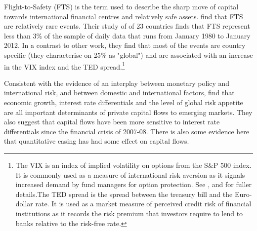 \documentclass[12pt, a4paper, oneside]{article} %
\begin{document}
Flight-to-Safety (FTS) is the term used to describe the sharp move of capital towards international financial centres and relatively safe assets.\citet{FTS} find that FTS are relatively rare events. Their study of of 23 countries finds that FTS represent less than 3\% of the sample of daily data that runs from January 1980 to January 2012.  In a contrast to other work, they find that most of the events are country specific (they characterise on 25\% as "global") and are associated with an increase in the VIX index and the TED spread.\footnote{The VIX is an index of implied volatility on options from the S\&P 500 index.  It is commonly used as a measure of international risk aversion as it signals increased demand by fund managers for option protection.  See \citet{VIX}, \citet{GoldmanVo} and \citet{Diamond} for fuller details.The TED spread is the spread between the treasury bill and the Euro-dollar rate.  It is used as a market measure of perceived credit risk of financial institutions as it records the risk premium that investors require to lend to banks relative to the risk-free rate.}   %


Consistent with the evidence of an interplay between monetary policy and international risk, and between domestic and international factors, \citet{Ahmed2014} find that economic growth, interest rate differentials and the level of global risk appetite are all important determinants of private capital flows to emerging markets.  They also suggest that capital flows have been more sensitive to interest rate differentials since the financial crisis of 2007-08. There is also some evidence here that quantitative easing has had some effect on capital flows. 
\end{document}
